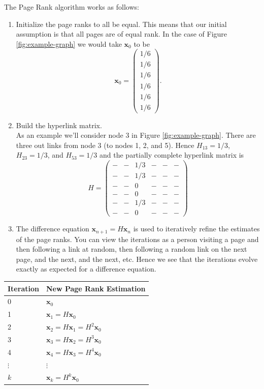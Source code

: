 \documentclass[
]{book}
\theoremstyle{definition}
\theoremstyle{definition}
\theoremstyle{definition}
\theoremstyle{remark}
\begin{document}
The Page Rank algorithm works as follows:

\begin{enumerate}
\def\labelenumi{\arabic{enumi}.}
\item
  Initialize the page ranks to all be equal. This means that our
  initial assumption is that all pages are of equal rank. In the case
  of Figure \ref{fig:example-graph} we would take \(\boldsymbol{x}_0\) to be
  \[\boldsymbol{x}_0 = \begin{pmatrix} 1/6 \\ 1/6 \\ 1/6 \\ 1/6 \\ 1/6 \\ 1/6 \end{pmatrix}.\]
\item
  Build the hyperlink matrix.\\
  As an example we'll consider node 3 in Figure \ref{fig:example-graph}. There are three out links from node 3
  (to nodes 1, 2, and 5). Hence \(H_{13}=1/3\), \(H_{23} = 1/3\), and
  \(H_{53} = 1/3\) and the partially complete hyperlink matrix is
  \[H = \begin{pmatrix} 
                  - & - & 1/3 & - & - & - \\
                  - & - & 1/3 & - & - & - \\
                  - & - & 0   & - & - & - \\
                  - & - & 0   & - & - & - \\
                  - & - & 1/3 & - & - & - \\
                  - & - & 0   & - & - & - 
              \end{pmatrix}\]
\item
  The difference equation \(\boldsymbol{x}_{n+1} = H \boldsymbol{x}_n\) is used to iteratively
  refine the estimates of the page ranks. You can view the iterations
  as a person visiting a page and then following a link at random,
  then following a random link on the next page, and the next, and the
  next, etc. Hence we see that the iterations evolve exactly as
  expected for a difference equation.
\end{enumerate}

\begin{longtable}[]{@{}ll@{}}
\toprule
Iteration & New Page Rank Estimation\tabularnewline
\midrule
\endhead
0 & \(\boldsymbol{x}_0\)\tabularnewline
1 & \(\boldsymbol{x}_1 = H \boldsymbol{x}_0\)\tabularnewline
2 & \(\boldsymbol{x}_2 = H \boldsymbol{x}_1 = H^2 \boldsymbol{x}_0\)\tabularnewline
3 & \(\boldsymbol{x}_3 = H \boldsymbol{x}_2 = H^3 \boldsymbol{x}_0\)\tabularnewline
4 & \(\boldsymbol{x}_4 = H \boldsymbol{x}_3 = H^4 \boldsymbol{x}_0\)\tabularnewline
\(\vdots\) & \(\vdots\)\tabularnewline
\(k\) & \(\boldsymbol{x}_k = H^k \boldsymbol{x}_0\)\tabularnewline
\bottomrule
\end{longtable}
\end{document}
